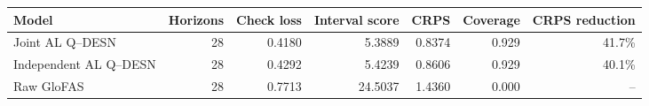 \begin{tabular}{lrrrrrr}
\toprule
Model & Horizons & Check loss & Interval score & CRPS & Coverage & CRPS reduction \\
\midrule
Joint AL Q--DESN & 28 & 0.4180 & 5.3889 & 0.8374 & 0.929 & 41.7\% \\
Independent AL Q--DESN & 28 & 0.4292 & 5.4239 & 0.8606 & 0.929 & 40.1\% \\
Raw GloFAS & 28 & 0.7713 & 24.5037 & 1.4360 & 0.000 & -- \\
\bottomrule
\end{tabular}
